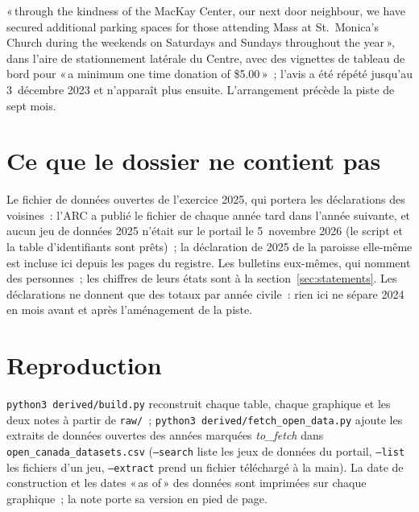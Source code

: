 \documentclass[11pt,letterpaper]{article}
\begin{document}
«\,through the kindness of the MacKay Center, our next door neighbour, we have secured additional parking spaces for those attending Mass at St.~Monica's Church during the weekends on Saturdays and Sundays throughout the year\,», dans l'aire de stationnement latérale du Centre, avec des vignettes de tableau de bord pour «\,a minimum one time donation of \$5.00\,»~; l'avis a été répété jusqu'au 3~décembre 2023 et n'apparaît plus ensuite. L'arrangement précède la piste de sept mois.

\section{Ce que le dossier ne contient pas}

Le fichier de données ouvertes de l'exercice 2025, qui portera les déclarations des voisines~: l'ARC a publié le fichier de chaque année tard dans l'année suivante, et aucun jeu de données 2025 n'était sur le portail le 5~novembre 2026 (le script et la table d'identifiants sont prêts)~; la déclaration de 2025 de la paroisse elle-même est incluse ici depuis les pages du registre. Les bulletins eux-mêmes, qui nomment des personnes~; les chiffres de leurs états sont à la section~\ref{sec:statements}. Les déclarations ne donnent que des totaux par année civile~: rien ici ne sépare 2024 en mois avant et après l'aménagement de la piste.

\section{Reproduction}

\texttt{python3 derived/build.py} reconstruit chaque table, chaque graphique et les deux notes à partir de \texttt{raw/}~; \texttt{python3 derived/fetch\_open\_data.py} ajoute les extraits de données ouvertes des années marquées \emph{to\_fetch} dans \texttt{open\_canada\_datasets.csv} (\texttt{--search} liste les jeux de données du portail, \texttt{--list} les fichiers d'un jeu, \texttt{--extract} prend un fichier téléchargé à la main). La date de construction et les dates «\,as of\,» des données sont imprimées sur chaque graphique~; la note porte sa version en pied de page.
\end{document}

